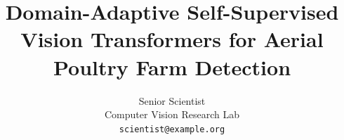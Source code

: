 \documentclass[10pt,twocolumn,letterpaper]{article}
\title{Domain-Adaptive Self-Supervised Vision Transformers for Aerial Poultry Farm Detection}
\author{Senior Scientist\\
Computer Vision Research Lab\\
{\tt\small scientist@example.org}
}
\begin{document}
\maketitle
    





{
    \small
    
    
}

% 
\end{document}
